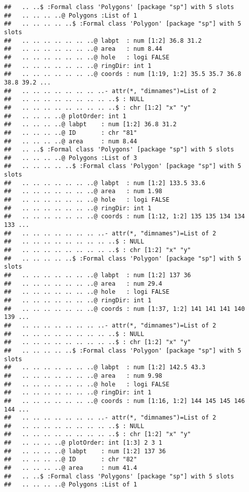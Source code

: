 \documentclass[]{article}
\begin{document}
\begin{verbatim}
##   .. ..$ :Formal class 'Polygons' [package "sp"] with 5 slots
##   .. .. .. ..@ Polygons :List of 1
##   .. .. .. .. ..$ :Formal class 'Polygon' [package "sp"] with 5 slots
##   .. .. .. .. .. .. ..@ labpt  : num [1:2] 36.8 31.2
##   .. .. .. .. .. .. ..@ area   : num 8.44
##   .. .. .. .. .. .. ..@ hole   : logi FALSE
##   .. .. .. .. .. .. ..@ ringDir: int 1
##   .. .. .. .. .. .. ..@ coords : num [1:19, 1:2] 35.5 35.7 36.8 38.8 39.2 ...
##   .. .. .. .. .. .. .. ..- attr(*, "dimnames")=List of 2
##   .. .. .. .. .. .. .. .. ..$ : NULL
##   .. .. .. .. .. .. .. .. ..$ : chr [1:2] "x" "y"
##   .. .. .. ..@ plotOrder: int 1
##   .. .. .. ..@ labpt    : num [1:2] 36.8 31.2
##   .. .. .. ..@ ID       : chr "81"
##   .. .. .. ..@ area     : num 8.44
##   .. ..$ :Formal class 'Polygons' [package "sp"] with 5 slots
##   .. .. .. ..@ Polygons :List of 3
##   .. .. .. .. ..$ :Formal class 'Polygon' [package "sp"] with 5 slots
##   .. .. .. .. .. .. ..@ labpt  : num [1:2] 133.5 33.6
##   .. .. .. .. .. .. ..@ area   : num 1.98
##   .. .. .. .. .. .. ..@ hole   : logi FALSE
##   .. .. .. .. .. .. ..@ ringDir: int 1
##   .. .. .. .. .. .. ..@ coords : num [1:12, 1:2] 135 135 134 134 133 ...
##   .. .. .. .. .. .. .. ..- attr(*, "dimnames")=List of 2
##   .. .. .. .. .. .. .. .. ..$ : NULL
##   .. .. .. .. .. .. .. .. ..$ : chr [1:2] "x" "y"
##   .. .. .. .. ..$ :Formal class 'Polygon' [package "sp"] with 5 slots
##   .. .. .. .. .. .. ..@ labpt  : num [1:2] 137 36
##   .. .. .. .. .. .. ..@ area   : num 29.4
##   .. .. .. .. .. .. ..@ hole   : logi FALSE
##   .. .. .. .. .. .. ..@ ringDir: int 1
##   .. .. .. .. .. .. ..@ coords : num [1:37, 1:2] 141 141 141 140 139 ...
##   .. .. .. .. .. .. .. ..- attr(*, "dimnames")=List of 2
##   .. .. .. .. .. .. .. .. ..$ : NULL
##   .. .. .. .. .. .. .. .. ..$ : chr [1:2] "x" "y"
##   .. .. .. .. ..$ :Formal class 'Polygon' [package "sp"] with 5 slots
##   .. .. .. .. .. .. ..@ labpt  : num [1:2] 142.5 43.3
##   .. .. .. .. .. .. ..@ area   : num 9.98
##   .. .. .. .. .. .. ..@ hole   : logi FALSE
##   .. .. .. .. .. .. ..@ ringDir: int 1
##   .. .. .. .. .. .. ..@ coords : num [1:16, 1:2] 144 145 145 146 144 ...
##   .. .. .. .. .. .. .. ..- attr(*, "dimnames")=List of 2
##   .. .. .. .. .. .. .. .. ..$ : NULL
##   .. .. .. .. .. .. .. .. ..$ : chr [1:2] "x" "y"
##   .. .. .. ..@ plotOrder: int [1:3] 2 3 1
##   .. .. .. ..@ labpt    : num [1:2] 137 36
##   .. .. .. ..@ ID       : chr "82"
##   .. .. .. ..@ area     : num 41.4
##   .. ..$ :Formal class 'Polygons' [package "sp"] with 5 slots
##   .. .. .. ..@ Polygons :List of 1

\end{verbatim}
\end{document}

